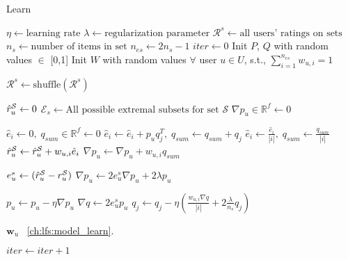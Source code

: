 \begin{algorithm}
  \caption{Learn \ES}
  \label{alg:alg-lfs-esarm}
  \begin{algorithmic}[1]
    \State $\eta \gets  \text{learning rate}$
    \State $\lambda \gets \text{regularization parameter}$
    \State $\mathcal{R}^s \gets \text{all users' ratings on sets}$  
    \State $n_s \gets \text{number of items in set}$
    \State $n_{es} \gets 2n_s - 1$ 
    \State $iter \gets 0$
    \State Init $P$, $Q$ with random values $\in$ [0,1] 
    \State Init $W$ with random values $\forall$ user $u \in U$, s.t.,
    $\sum_{i=1}^{n_{es}}w_{u,i}=1$
    
    

      \State $\mathcal{R}^s \gets \text{shuffle}(\mathcal{R}^s)$
      \State 
        
        \State $\mbox{$\hat{r}_{u}^{\mathcal{S}}$} \gets 0$
        \State $\mathcal{E}_s \gets \text{All possible extremal subsets
        for set }\mathcal{S}$
        \State         
        \State $\nabla p_u \in \mathbb{R}^f \gets 0$ 
        
          \State $\hat{e}_i \gets 0,\; q_{sum} \in \mathbb{R}^f \gets 0$
            \State $\hat{e}_i \gets \hat{e}_i + p_uq_j^T, \; q_{sum} \gets q_{sum} + q_j$
          \EndFor
          \State $\hat{e}_i \gets \frac{\hat{e}_i}{|i|},\; q_{sum} \gets \frac{q_{sum}}{|i|}$
          \State $\mbox{$\hat{r}_{u}^{\mathcal{S}}$} \gets \mbox{$\hat{r}_{u}^{\mathcal{S}}$} + w_{u,i}\hat{e}_i$
          \State $\nabla p_u \gets \nabla p_u + w_{u,i}q_{sum}$
        \EndFor
        
        \State $e_{u}^s \gets (\mbox{$\hat{r}_{u}^{\mathcal{S}}$} - \mbox{$r_{u}^{\mathcal{S}}$})$
        \State $\nabla p_u \gets 2e_{u}^s\nabla p_u +
        2\lambda p_u$ 
 
        \State $p_u \gets p_u - \eta \nabla p_u$
        \State         
        \State $\nabla q \gets 2e_u^s p_u$
          \State $q_j \gets q_j - \eta (\frac{w_{u,i}{\nabla q} }{|i|} +
            2\frac{\lambda}{n_s}q_j)$  
          \EndFor  
        \EndFor

      \EndFor
      
      \State
        \State {} $\bm{w}_u$  
        \State {}~\ref{ch:lfs:model_learn}. 
      \EndFor

      \State
      \State $iter \gets iter + 1$
    \EndWhile

    \EndProcedure
  \end{algorithmic}
\end{algorithm}


